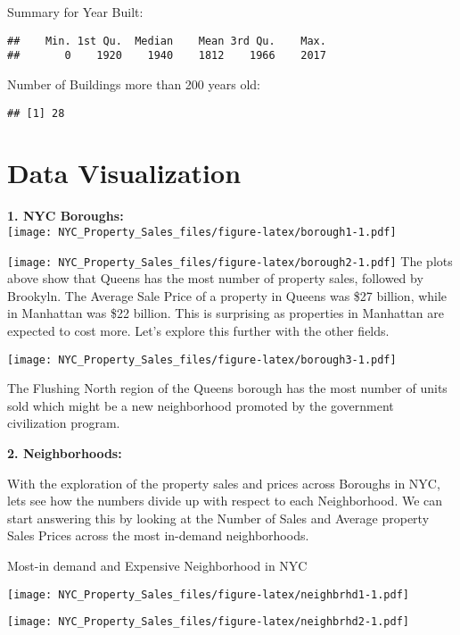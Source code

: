 \documentclass[
  a3paper,
]{article}
\begin{document}
Summary for Year Built:

\begin{verbatim}
##    Min. 1st Qu.  Median    Mean 3rd Qu.    Max. 
##       0    1920    1940    1812    1966    2017
\end{verbatim}

Number of Buildings more than 200 years old:

\begin{verbatim}
## [1] 28
\end{verbatim}

\newpage

\hypertarget{data-visualization}{%
\section{\texorpdfstring{\textbf{Data
Visualization}}{Data Visualization}}\label{data-visualization}}

\textbf{1. NYC Boroughs:}\\
\texttt{[image: NYC\_Property\_Sales\_files/figure-latex/borough1-1.pdf]}

\texttt{[image: NYC\_Property\_Sales\_files/figure-latex/borough2-1.pdf]}
The plots above show that Queens has the most number of property sales,
followed by Brookyln. The Average Sale Price of a property in Queens was
\$27 billion, while in Manhattan was \$22 billion. This is surprising as
properties in Manhattan are expected to cost more. Let's explore this
further with the other fields.

\texttt{[image: NYC\_Property\_Sales\_files/figure-latex/borough3-1.pdf]}

The Flushing North region of the Queens borough has the most number of
units sold which might be a new neighborhood promoted by the government
civilization program.\\
\newpage

\textbf{2. Neighborhoods:}

With the exploration of the property sales and prices across Boroughs in
NYC, lets see how the numbers divide up with respect to each
Neighborhood. We can start answering this by looking at the Number of
Sales and Average property Sales Prices across the most in-demand
neighborhoods.

Most-in demand and Expensive Neighborhood in NYC

\texttt{[image: NYC\_Property\_Sales\_files/figure-latex/neighbrhd1-1.pdf]}

\texttt{[image: NYC\_Property\_Sales\_files/figure-latex/neighbrhd2-1.pdf]}
\end{document}
